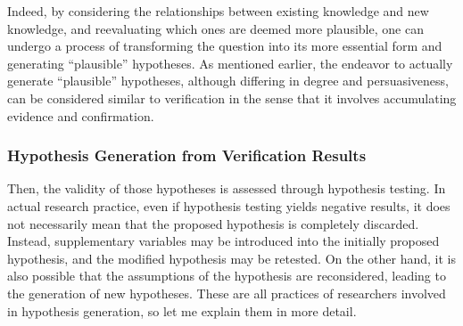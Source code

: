 \documentclass{book}
\begin{document}
Indeed, by considering the relationships between existing knowledge and new knowledge, and reevaluating which ones are deemed more plausible, one can undergo a process of transforming the question into its more essential form and generating ``plausible'' hypotheses. As mentioned earlier, the endeavor to actually generate ``plausible'' hypotheses, although differing in degree and persuasiveness, can be considered similar to verification in the sense that it involves accumulating evidence and confirmation.



\subsubsection{Hypothesis Generation from Verification Results}

Then, the validity of those hypotheses is assessed through hypothesis testing. In actual research practice, even if hypothesis testing yields negative results, it does not necessarily mean that the proposed hypothesis is completely discarded. Instead, supplementary variables may be introduced into the initially proposed hypothesis, and the modified hypothesis may be retested. On the other hand, it is also possible that the assumptions of the hypothesis are reconsidered, leading to the generation of new hypotheses. These are all practices of researchers involved in hypothesis generation, so let me explain them in more detail.
\end{document}
